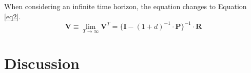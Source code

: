 \documentclass[11pt]{article}
\begin{document}
When considering an infinite time horizon, the equation changes to Equation \ref{eq2}.
\begin{equation}\label{eq2}
\textbf{V} \equiv \lim_{T \rightarrow \infty} \textbf{V}^T = \{\textbf{I} - (1 + d)^{-1} \cdot \textbf{P} \}^{-1} \cdot \textbf{R}
\end{equation}


\section{Discussion}

\end{document}
